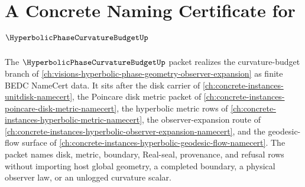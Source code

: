 \chapter{A Concrete Naming Certificate for $\HyperbolicPhaseCurvatureBudgetUp$}
\label{ch:concrete-instances-hyperbolic-phase-curvature-budget-namecert}

The $\HyperbolicPhaseCurvatureBudgetUp$ packet realizes the curvature-budget branch of \autoref{ch:visions-hyperbolic-phase-geometry-observer-expansion} as finite BEDC NameCert data. It sits after the disk carrier of \autoref{ch:concrete-instances-unitdisk-namecert}, the Poincare disk metric packet of \autoref{ch:concrete-instances-poincare-disk-metric-namecert}, the hyperbolic metric rows of \autoref{ch:concrete-instances-hyperbolic-metric-namecert}, the observer-expansion route of \autoref{ch:concrete-instances-hyperbolic-observer-expansion-namecert}, and the geodesic-flow surface of \autoref{ch:concrete-instances-hyperbolic-geodesic-flow-namecert}. The packet names disk, metric, boundary, Real-seal, provenance, and refusal rows without importing host global geometry, a completed boundary, a physical observer law, or an unlogged curvature scalar.

